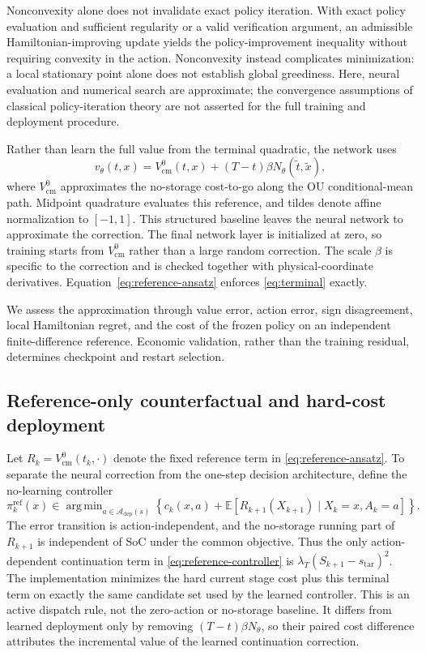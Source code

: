 \documentclass[preprint,11pt]{elsarticle}
\DeclareMathOperator*{\argmin}{arg\,min}
\newcommand{\E}{\mathbb{E}}
\newcommand{\cA}{\mathcal{A}}
\theoremstyle{plain}
\theoremstyle{remark}
\begin{document}
Nonconvexity alone does not invalidate exact policy iteration. With exact
policy evaluation and sufficient regularity or a valid verification argument,
an admissible Hamiltonian-improving update yields the policy-improvement
inequality without requiring convexity in the action. Nonconvexity instead
complicates minimization: a local stationary point alone does not establish
global greediness. Here, neural evaluation and numerical search are
approximate; the convergence assumptions of classical policy-iteration theory
\citep{Kerimkulov2020} are not asserted for the full training and deployment
procedure.

Rather than learn the full value from the terminal quadratic, the network uses
\begin{equation}
 v_\theta(t,x)=V^{0}_{\mathrm{cm}}(t,x)
 +(T-t)\beta N_\theta(\widetilde t,\widetilde x),
 \label{eq:reference-ansatz}
\end{equation}
where $V^{0}_{\mathrm{cm}}$ approximates the no-storage cost-to-go along the
OU conditional-mean path. Midpoint quadrature evaluates this
reference, and tildes denote affine normalization to $[-1,1]$. This structured
baseline leaves the neural network to approximate the correction. The final network
layer is initialized at zero, so training starts from $V^{0}_{\mathrm{cm}}$
rather than a large random correction. The scale $\beta$ is specific to the
correction and is checked together with physical-coordinate derivatives.
Equation~\eqref{eq:reference-ansatz} enforces \eqref{eq:terminal} exactly.

We assess the approximation through value error, action error, sign
disagreement, local Hamiltonian regret, and the cost of the frozen policy
on an independent finite-difference reference. Economic validation, rather
than the training residual, determines checkpoint and restart selection.

\subsection{Reference-only counterfactual and hard-cost deployment}

Let $R_k=V^0_{\mathrm{cm}}(t_k,\cdot)$ denote the fixed reference term in
\eqref{eq:reference-ansatz}. To separate the neural correction from the
one-step decision architecture, define the no-learning controller
\begin{equation}
 \pi_k^{\mathrm{ref}}(x)\in\argmin_{a\in\cA_{\mathrm{dep}}(s)}
 \left\{c_k(x,a)+
 \E[R_{k+1}(X_{k+1})\mid X_k=x,A_k=a]\right\}.
 \label{eq:reference-controller}
\end{equation}
The error transition is action-independent, and the no-storage running part
of $R_{k+1}$ is independent of SoC under the common objective. Thus the only
action-dependent continuation term in \eqref{eq:reference-controller} is
$\lambda_T(S_{k+1}-s_{\mathrm{tar}})^2$. The implementation minimizes the
hard current stage cost plus this terminal term on exactly the same candidate
set used by the learned controller. This is an active dispatch rule, not the
zero-action or no-storage baseline. It differs from learned deployment only by
removing $(T-t)\beta N_\theta$, so their paired cost difference attributes the
incremental value of the learned continuation correction.
\end{document}
